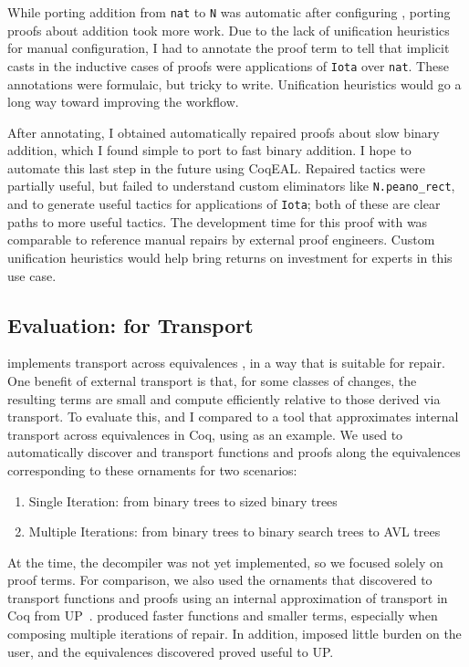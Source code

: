 While porting addition from \lstinline{nat} to \lstinline{N} was automatic after configuring \toolnamec,
porting proofs about addition took more work.
Due to the lack of unification heuristics for manual configuration,
I had to annotate the proof term to tell \toolnamec that implicit casts in the inductive cases of proofs were applications of \lstinline{Iota}
over \lstinline{nat}.
These annotations were formulaic, but tricky to write.
Unification heuristics would go a long way toward improving the workflow. %

After annotating, I obtained automatically repaired proofs about slow binary addition,
which I found simple to port to fast binary addition.
I hope to automate this last step in the future using CoqEAL. %
Repaired tactics were partially useful, but failed to understand custom eliminators like \lstinline{N.peano_rect}, and to generate useful
tactics for applications of \lstinline{Iota}; both of these are clear paths to more useful tactics.
The development time for this proof with \toolnamec was comparable to reference manual repairs by external proof engineers.
Custom unification heuristics would help bring returns on investment for experts in this use case.

\subsection{Evaluation: \toolnamec for Transport}
\label{sec:eval}

\toolnamec implements transport across equivalences , in a way that is suitable for repair.
One benefit of external transport is that, for some classes of changes,
the resulting terms are small and compute efficiently relative to those derived via  transport.
To evaluate this,  and I compared \toolnamec to a tool that approximates internal transport across equivalences in Coq,
using  as an example.
We used \toolnamec to automatically discover and transport functions and proofs along the equivalences
corresponding to these ornaments for two scenarios:

\begin{enumerate}
\item Single Iteration: from binary trees to sized binary trees
\item Multiple Iterations: from binary trees to binary search trees to AVL trees
\end{enumerate}
At the time, the decompiler was not yet implemented, so we focused solely on proof terms.
For comparison, we also used the ornaments that \toolnamec discovered to transport functions
and proofs using an internal approximation of transport in Coq from UP~\cite{tabareau2017equivalences}.
\toolnamec produced faster functions and smaller terms, especially when composing multiple iterations of repair.
In addition, \toolnamec imposed little burden on the user, and the equivalences \toolnamec discovered proved useful to UP.

